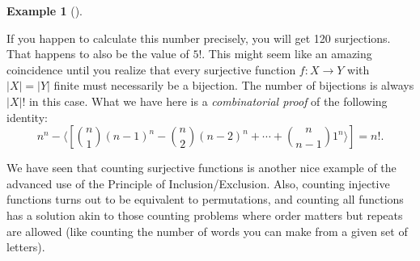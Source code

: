 \documentclass[10pt,]{book}
\theoremstyle{plain}
\theoremstyle{definition}
\newtheorem{example}[theorem]{Example}
\theoremstyle{definition}
\theoremstyle{definition}
\numberwithin{equation}{section}
\newcommand{\card}[1]{\left| #1 \right|}
\begin{document}
\begin{example}[]
\begin{enumerate}
      If you happen to calculate this number precisely, you will get 120 surjections.  That happens to also be the value of \(5!\).  This might seem like an amazing coincidence until you realize that every surjective function \(f:X \to Y\) with \(\card{X} = \card{Y}\) finite must necessarily be a bijection.  The number of bijections is always \(\card{X}!\) in this case.  What we have here is a \emph{combinatorial proof} of the following identity:
      \begin{equation*}
        n^n - \langle[{n\choose 1}(n-1)^n - {n \choose 2}(n-2)^n + \cdots + {n \choose n-1}1^n \rangle] = n!.
      \end{equation*}
\end{enumerate}
\end{example}
\par

    We have seen that counting surjective functions is another nice example of the advanced use of the Principle of Inclusion/Exclusion. Also, counting injective functions turns out to be equivalent to permutations, and counting all functions has a solution akin to those counting problems where order matters but repeats are allowed (like counting the number of words you can make from a given set of letters).
\par
\end{document}
